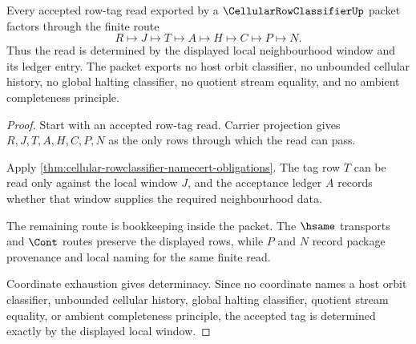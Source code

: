 \begin{theorem}
\label{thm:cellular-rowclassifier-local-window-determinacy}
Every accepted row-tag read exported by a $\CellularRowClassifierUp$ packet factors through the finite route
$$
R \longmapsto J \longmapsto T \longmapsto A \longmapsto H \longmapsto C \longmapsto P \longmapsto N.
$$
Thus the read is determined by the displayed local neighbourhood window and its ledger entry. The packet exports no host orbit classifier, no unbounded cellular history, no global halting classifier, no quotient stream equality, and no ambient completeness principle.
\end{theorem}
\begin{proof}
Start with an accepted row-tag read. Carrier projection gives $R,J,T,A,H,C,P,N$ as the only rows through which the read can pass.

Apply \autoref{thm:cellular-rowclassifier-namecert-obligations}. The tag row $T$ can be read only against the local window $J$, and the acceptance ledger $A$ records whether that window supplies the required neighbourhood data.

The remaining route is bookkeeping inside the packet. The $\hsame$ transports and $\Cont$ routes preserve the displayed rows, while $P$ and $N$ record package provenance and local naming for the same finite read.

Coordinate exhaustion gives determinacy. Since no coordinate names a host orbit classifier, unbounded cellular history, global halting classifier, quotient stream equality, or ambient completeness principle, the accepted tag is determined exactly by the displayed local window.
\end{proof}

